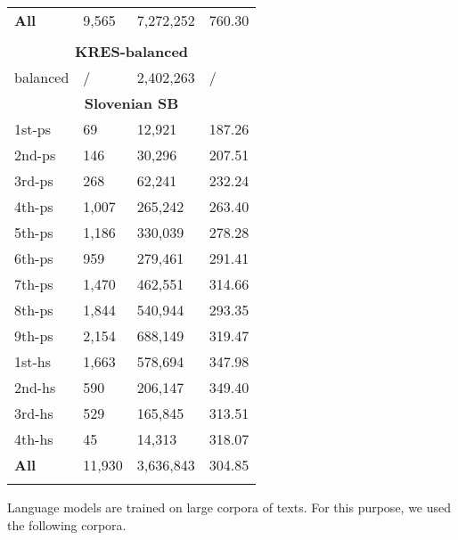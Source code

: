 \documentclass{clv3}
\begin{document}
\begin{table*}[!ht]
\begin{tabular}{llll}
  \textbf{All} & 9,565 & 7,272,252 & 760.30\\
  &&& \\
  \multicolumn{4}{c}{\textbf{KRES-balanced}}\\\hline
  balanced & / & 2,402,263 & / \\
  \multicolumn{4}{c}{\textbf{Slovenian SB}}\\\hline
  1st-ps & 69 & 12,921 & 187.26\\
  2nd-ps & 146 & 30,296 & 207.51\\
  3rd-ps & 268 & 62,241 & 232.24\\
  4th-ps & 1,007 & 265,242 & 263.40\\
  5th-ps & 1,186 & 330,039 & 278.28\\
  6th-ps & 959 & 279,461 & 291.41\\
  7th-ps & 1,470 & 462,551 & 314.66\\
  8th-ps & 1,844 & 540,944 & 293.35\\
  9th-ps & 2,154 & 688,149 & 319.47\\
  1st-hs & 1,663 & 578,694 & 347.98\\
  2nd-hs & 590 & 206,147 & 349.40\\
  3rd-hs & 529 & 165,845 & 313.51\\
  4th-hs & 45 & 14,313 & 318.07\\
  \textbf{All} & 11,930 & 3,636,843 & 304.85\\

\vspace*{0.5cm}
 
\end{tabular}
\label{table:corpus-stats}
\end{table*}



Language models are trained on large corpora of texts. For this purpose, we used the following corpora.
\end{document}
